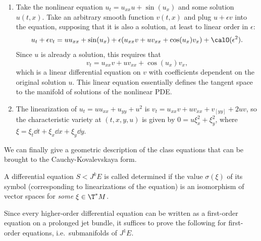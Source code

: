 \begin{example}
    \begin{enumerate}
        \item Take the nonlinear equation $u_t=u_{xx}u+\sin(u_x)$ and some solution $u(t,x)$. Take an arbitrary smooth function $v(t,x)$ and plug $u+\epsilon v$ into the equation, supposing that it is also a solution, at least to linear order in $\epsilon$:
        \[u_t+\epsilon v_t=u u_{xx}+\sin(u_x)+\epsilon(u_{xx}v+uv_{xx}+\cos(u_x)v_x)+\calO(\epsilon^2).\]
        Since $u$ is already a solution, this requires that 
        \[v_t=u_{xx}v+uv_{xx}+\cos(u_x)v_x,\]
        which is a linear differential equation on $v$ with coefficients dependent on the original solution $u$. This linear equation essentially defines the tangent space to the manifold of solutions of the nonlinear PDE.
        \item The linearization of $u_t=uu_{xx}+u_{yy}+u^2$ is $v_t=u_{xx}v+uv_{xx}+v_[yy]+2uv$, so the characteristic variety at $(t,x,y,u)$ is given by $0=u\xi_x^2+\xi_y^2$, where $\xi=\xi_t \dd t+\xi_x\dd x+\xi_y\dd y$.
    \end{enumerate}
\end{example}

We can finally give a geometric description of the class equations that can be brought to the Cauchy-Kovalevskaya form.

\begin{defn}
    A differential equation $S<J^k E$ is called determined if the value  $\sigma(\xi)$ of its symbol (corresponding to linearizations of the equation) is an isomorphism of vector spaces for \emph{some} $\xi\in \T^\ast M$.
\end{defn}

Since every higher-order differential equation can be written as a first-order equation on a prolonged jet bundle, it suffices to prove the following for first-order equations, i.e.\ submanifolds of $J^1E$.

